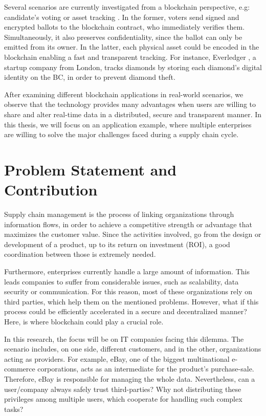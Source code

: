 Several scenarios are currently investigated from a blockchain perspective, e.g: candidate's voting or asset tracking \cite{abeyratne2016blockchain}. In the former, voters send signed and encrypted ballots to the blockchain contract, who immediately verifies them. Simultaneously, it also preserves confidentiality, since the ballot can only be emitted from its owner. In the latter, each physical asset could be encoded in the blockchain enabling a fast and transparent tracking. For instance, Everledger \citep{lomas2015everledger}, a startup company from London, tracks diamonds by storing each diamond's digital identity on the BC, in order to prevent diamond theft.

After examining different blockchain applications in real-world scenarios, we observe that the technology provides many advantages when users are willing to share and alter real-time data in a distributed, secure and transparent manner. In this thesis, we will focus on an application example, where multiple enterprises are willing to solve the major challenges faced during a supply chain cycle.

\section{Problem Statement and Contribution}

Supply chain management is the process of linking organizations through information flows, in order to achieve a competitive strength or advantage that maximizes the customer value. Since the activities involved, go from the design or development of a product, up to its return on investment (ROI), a good coordination between those is extremely needed.

Furthermore, enterprises currently handle a large amount of information. This leads companies to suffer from considerable issues, such as scalability, data security or communication. For this reason, most of these organizations rely on third parties, which help them on the mentioned problems. However, what if this process could be efficiently accelerated in a secure and decentralized manner? Here, is where blockchain could play a crucial role.

In this research, the focus will be on IT companies facing this dilemma. The scenario includes, on one side, different customers, and in the other, organizations acting as providers. For example, eBay, one of the biggest multinational e-commerce corporations, acts as an intermediate for the product's purchase-sale. Therefore, eBay is responsible for managing the whole data. Nevertheless, can a user/company always safely trust third-parties? Why not distributing these privileges among multiple users, which cooperate for handling such complex tasks?

